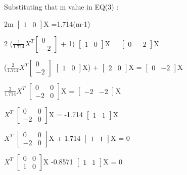 \documentclass{beamer}
\begin{document}
\begin{frame}
Substituting that m value in EQ(3) :


2m
$\begin{bmatrix}
 1 & 0 
\end{bmatrix}$X =1.714(m-1) 

2 ($\frac{1}{1.714}X^{T}
\begin{bmatrix}
 0 \\ 
 -2 
\end{bmatrix}$  + 1) 
$\begin{bmatrix}
 1 & 0 
\end{bmatrix}$X = 
$\begin{bmatrix}
 0 & -2 
\end{bmatrix}$X

($\frac{2}{1.714}X^{T}
\begin{bmatrix}
 0 \\ 
 -2 
\end{bmatrix}$
$\begin{bmatrix}
 1 & 0 
\end{bmatrix}$X) +
$\begin{bmatrix}
 2 & 0 
\end{bmatrix}$X = 
$\begin{bmatrix}
 0 & -2 
\end{bmatrix}$X

$\frac{2}{1.714}X^{T}$
$\begin{bmatrix}
 0 & 0 \\
 -2 & 0 
\end{bmatrix}$X =
$\begin{bmatrix}
 -2 & -2 
\end{bmatrix}$X

$X^{T}$
$\begin{bmatrix}
 0 & 0 \\
 -2 & 0 
\end{bmatrix}$X =
-1.714 
$\begin{bmatrix}
 1 & 1 
\end{bmatrix}$X

$X^{T}$
$\begin{bmatrix}
 0 & 0 \\
 -2 & 0 
\end{bmatrix}$X +
1.714
$\begin{bmatrix}
 1 & 1 
\end{bmatrix}$X = 0

$X^{T}$
$\begin{bmatrix}
 0 & 0 \\
 1 & 0 
\end{bmatrix}$X  
-0.8571
$\begin{bmatrix}
 1 & 1 
\end{bmatrix}$X = 0

 
\end{frame}
\end{document}
